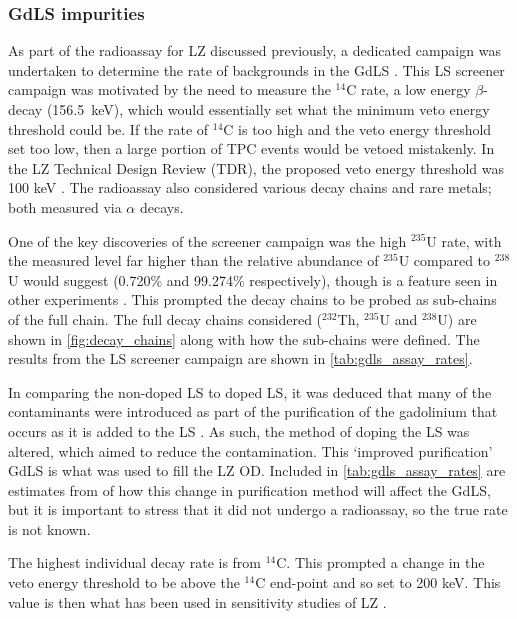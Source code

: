 \subsubsection{GdLS impurities}
\par
As part of the radioassay for LZ discussed previously, a dedicated campaign was undertaken to determine the rate of backgrounds in the GdLS \cite{scotthaselschwardt_thesis_ref}.
This LS screener campaign was motivated by the need to measure the $^{14}$C rate, a low energy $\beta$-decay (156.5~keV), which would essentially set what the minimum veto energy threshold could be.
If the rate of $^{14}$C is too high and the veto energy threshold set too low, then a large portion of TPC events would be vetoed mistakenly.
In the LZ Technical Design Review (TDR), the proposed veto energy threshold was 100 keV \cite{LZ_TechnicalDesignReview_ref}.
The radioassay also considered various decay chains and rare metals; both measured via $\alpha$ decays.
\par
One of the key discoveries of the screener campaign was the high ${}^{235}$U rate, with the measured level far higher than the relative abundance of ${}^{235}$U compared to ${}^{238}$U would suggest (0.720\% and 99.274\% respectively), though is a feature seen in other experiments \cite{javierperez_thesis_ref,superkamiokande_neutron_tagging_ref}.
This prompted the decay chains to be probed as sub-chains of the full chain.
The full decay chains considered ($^{232}$Th, $^{235}$U and $^{238}$U) are shown in \autoref{fig:decay_chains} along with how the sub-chains were defined.
The results from the LS screener campaign are shown in \autoref{tab:gdls_assay_rates}.
\par
In comparing the non-doped LS to doped LS, it was deduced that many of the contaminants were introduced as part of the purification of the gadolinium that occurs as it is added to the LS \cite{scotthaselschwardt_thesis_ref}.
As such, the method of doping the LS was altered, which aimed to reduce the contamination.
This `improved purification' GdLS is what was used to fill the LZ OD.
Included in \autoref{tab:gdls_assay_rates} are estimates from \cite{scotthaselschwardt_thesis_ref} of how this change in purification method will affect the GdLS, but it is important to stress that it did not undergo a radioassay, so the true rate is not known.
\par
The highest individual decay rate is from ${}^{14}$C.
This prompted a change in the veto energy threshold to be above the ${}^{14}$C end-point and so set to 200 keV.
This value is then what has been used in sensitivity studies of LZ \cite{LZ_projected_sensitivity_paper_ref}.

